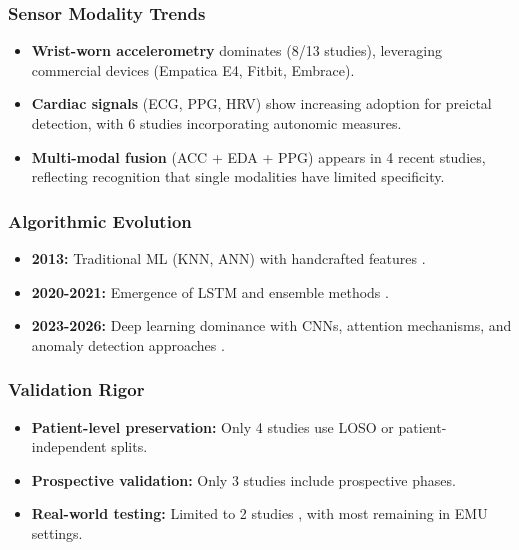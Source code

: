 \subsubsection{Sensor Modality Trends}
\begin{itemize}
  \item \textbf{Wrist-worn accelerometry} dominates (8/13 studies), leveraging commercial devices (Empatica E4, Fitbit, Embrace).
  \item \textbf{Cardiac signals} (ECG, PPG, HRV) show increasing adoption for preictal detection, with 6 studies incorporating autonomic measures.
  \item \textbf{Multi-modal fusion} (ACC + EDA + PPG) appears in 4 recent studies, reflecting recognition that single modalities have limited specificity.
\end{itemize}

\subsubsection{Algorithmic Evolution}
\begin{itemize}
  \item \textbf{2013:} Traditional ML (KNN, ANN) with handcrafted features \parencite{borujenyDetectionEpilepticSeizure2013}.
  \item \textbf{2020-2021:} Emergence of LSTM and ensemble methods \parencite{meiselMachineLearningWristband2020,stirlingForecastingSeizureLikelihood2021}.
  \item \textbf{2023-2026:} Deep learning dominance with CNNs, attention mechanisms, and anomaly detection approaches \parencite{reintjesECGBasedDetectionEpileptic2025,odeDevelopmentEpilepticSeizure2023,spahrDeepLearningbasedDetection2025}.
\end{itemize}

\subsubsection{Validation Rigor}
\begin{itemize}
  \item \textbf{Patient-level preservation:} Only 4 studies use LOSO or patient-independent splits.
  \item \textbf{Prospective validation:} Only 3 studies \parencite{spahrDeepLearningbasedDetection2025,dongTwoLayerEnsembleMethod2022,elemamAutomatedValidatedTool2025} include prospective phases.
  \item \textbf{Real-world testing:} Limited to 2 studies \parencite{vielufSeizureMonitoringCombined2025,nasseriAmbulatorySeizureForecasting2021}, with most remaining in EMU settings.
\end{itemize}

